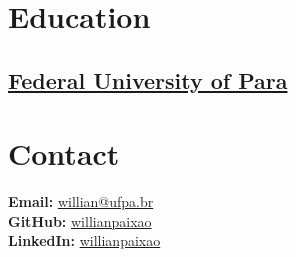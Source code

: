 \documentclass[]{willianpaixao-resume}
\begin{document}
\lastupdated



\begin{minipage}[t]{0.30\textwidth}

\section{Education}

\subsection{\href{https://ufpa.br/}{Federal University of Para}}
\sectionsep


\section{Contact}
\textbf{Email:} \href{mailto:willian@ufpa.br}{willian@ufpa.br}\\
\textbf{GitHub:} \href{https://github.com/willianpaixao}{willianpaixao}\\
\textbf{LinkedIn:} \href{https://www.linkedin.com/in/willianpaixao}{willianpaixao}\\
\sectionsep





\end{minipage}
\end{document}
